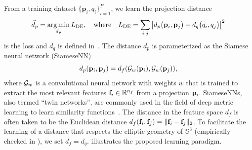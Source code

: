 From a training dataset ${\{ \mathbf{p}_{i}, q_i \}}_{i=1}^{P}$, we learn the projection distance
\begin{equation}
    \widehat{d_p} = \operatorname*{arg\,min}_{d_p} L_\text{DE},
    \quad \text{where} \quad
    L_\text{DE} = \sum_{i,j} \left| d_p\big(\mathbf{p}_{i},\mathbf{p}_{j}\big) - d_q\big(q_i,q_j\big) \right|^2
    \label{eqn:distance-learning}
\end{equation}
is the loss and $d_q$ is defined in~.
The distance $d_p$ is parameterized as the Siamese neural network (SiameseNN)~\cite{chopra2005learning}
\begin{equation*}
    d_p(\mathbf{p}_i, \mathbf{p}_j) = d_f(\mathcal{G}_w(\mathbf{p}_i), \mathcal{G}_w(\mathbf{p}_j)),
\end{equation*}
where $\mathcal{G}_w$ is a convolutional neural network with weights $w$ that is trained to extract the most relevant features $\mathbf{f}_i \in \mathbb{R}^{n_f}$ from a projection $\mathbf{p}_i$.
SiameseNNs, also termed ``twin networks'', are commonly used in the field of deep metric learning to learn similarity functions~\cite{yi2014deep}.
The distance in the feature space $d_f$ is often taken to be the Euclidean distance $d_f(\mathbf{f}_i, \mathbf{f}_j) = \Vert \mathbf{f}_i - \mathbf{f}_j \Vert_2$.
To facilitate the learning of a distance that respects the elliptic geometry of $\mathbb{S}^3$ (empirically checked in ), we set $d_f = d_q$.
 illustrates the proposed learning paradigm.

